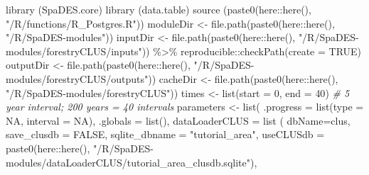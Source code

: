 \documentclass[
]{article}
\newenvironment{Shaded}{\begin{snugshade}}{\end{snugshade}}
\newcommand{\AttributeTok}[1]{\textcolor[rgb]{0.77,0.63,0.00}{#1}}
\newcommand{\CommentTok}[1]{\textcolor[rgb]{0.56,0.35,0.01}{\textit{#1}}}
\newcommand{\ConstantTok}[1]{\textcolor[rgb]{0.00,0.00,0.00}{#1}}
\newcommand{\DecValTok}[1]{\textcolor[rgb]{0.00,0.00,0.81}{#1}}
\newcommand{\FunctionTok}[1]{\textcolor[rgb]{0.00,0.00,0.00}{#1}}
\newcommand{\NormalTok}[1]{#1}
\newcommand{\OtherTok}[1]{\textcolor[rgb]{0.56,0.35,0.01}{#1}}
\newcommand{\SpecialCharTok}[1]{\textcolor[rgb]{0.00,0.00,0.00}{#1}}
\newcommand{\StringTok}[1]{\textcolor[rgb]{0.31,0.60,0.02}{#1}}
\begin{document}
\begin{Shaded}
\begin{Highlighting}[]
\FunctionTok{library}\NormalTok{ (SpaDES.core)}
\FunctionTok{library}\NormalTok{ (data.table)}
\FunctionTok{source}\NormalTok{ (}\FunctionTok{paste0}\NormalTok{(here}\SpecialCharTok{::}\FunctionTok{here}\NormalTok{(), }\StringTok{"/R/functions/R\_Postgres.R"}\NormalTok{))}
\NormalTok{moduleDir }\OtherTok{\textless{}{-}} \FunctionTok{file.path}\NormalTok{(}\FunctionTok{paste0}\NormalTok{(here}\SpecialCharTok{::}\FunctionTok{here}\NormalTok{(), }\StringTok{"/R/SpaDES{-}modules"}\NormalTok{))}
\NormalTok{inputDir }\OtherTok{\textless{}{-}} \FunctionTok{file.path}\NormalTok{(}\FunctionTok{paste0}\NormalTok{(here}\SpecialCharTok{::}\FunctionTok{here}\NormalTok{(), }\StringTok{"/R/SpaDES{-}modules/forestryCLUS/inputs"}\NormalTok{)) }\SpecialCharTok{\%\textgreater{}\%}\NormalTok{ reproducible}\SpecialCharTok{::}\FunctionTok{checkPath}\NormalTok{(}\AttributeTok{create =} \ConstantTok{TRUE}\NormalTok{)}
\NormalTok{outputDir }\OtherTok{\textless{}{-}} \FunctionTok{file.path}\NormalTok{(}\FunctionTok{paste0}\NormalTok{(here}\SpecialCharTok{::}\FunctionTok{here}\NormalTok{(), }\StringTok{"/R/SpaDES{-}modules/forestryCLUS/outputs"}\NormalTok{))}
\NormalTok{cacheDir }\OtherTok{\textless{}{-}} \FunctionTok{file.path}\NormalTok{(}\FunctionTok{paste0}\NormalTok{(here}\SpecialCharTok{::}\FunctionTok{here}\NormalTok{(), }\StringTok{"/R/SpaDES{-}modules/forestryCLUS"}\NormalTok{))}
\NormalTok{times }\OtherTok{\textless{}{-}} \FunctionTok{list}\NormalTok{(}\AttributeTok{start =} \DecValTok{0}\NormalTok{, }\AttributeTok{end =} \DecValTok{40}\NormalTok{) }\CommentTok{\# 5 year interval; 200 years = 40 intervals}
\NormalTok{parameters }\OtherTok{\textless{}{-}} \FunctionTok{list}\NormalTok{(}
  \AttributeTok{.progress =} \FunctionTok{list}\NormalTok{(}\AttributeTok{type =} \ConstantTok{NA}\NormalTok{, }\AttributeTok{interval =} \ConstantTok{NA}\NormalTok{),}
  \AttributeTok{.globals =} \FunctionTok{list}\NormalTok{(),}
  \AttributeTok{dataLoaderCLUS =} \FunctionTok{list}\NormalTok{ (  }\AttributeTok{dbName=}\StringTok{\textquotesingle{}clus\textquotesingle{}}\NormalTok{,}
                           \AttributeTok{save\_clusdb =} \ConstantTok{FALSE}\NormalTok{,}
                           \AttributeTok{sqlite\_dbname =} \StringTok{"tutorial\_area"}\NormalTok{,}
                           \AttributeTok{useCLUSdb =} \FunctionTok{paste0}\NormalTok{(here}\SpecialCharTok{::}\FunctionTok{here}\NormalTok{(), }\StringTok{"/R/SpaDES{-}modules/dataLoaderCLUS/tutorial\_area\_clusdb.sqlite"}\NormalTok{),}

\end{Highlighting}
\end{Shaded}
\end{document}
